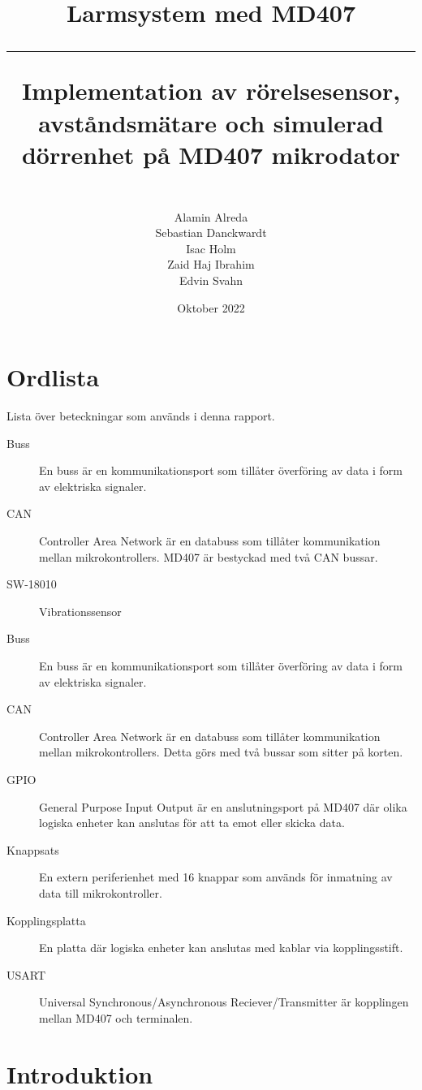 \documentclass{article}
\title{\textbf{Larmsystem med MD407}\\ 
     \hspace{10cm}
     \hrule
    \hspace{10cm}
    Implementation av rörelsesensor, avståndsmätare och simulerad dörrenhet på MD407 mikrodator}
\author{\\Alamin Alreda\\Sebastian Danckwardt\\Isac Holm\\Zaid Haj Ibrahim\\Edvin Svahn}
\date{Oktober 2022}
\begin{document}
\maketitle
\newpage
\tableofcontents
\newpage
\section*{Ordlista}
Lista över beteckningar som används i denna rapport.
\begin{description}

\item[Buss] En buss är en kommunikationsport som tillåter överföring av data i form av elektriska signaler.

\item[CAN] Controller Area Network är en databuss som tillåter kommunikation mellan mikrokontrollers. MD407 är bestyckad med två CAN bussar.

\item[SW-18010] Vibrationssensor

\item[Buss] En buss är en kommunikationsport som tillåter överföring av data i form av elektriska signaler.

\item[CAN] Controller Area Network är en databuss som tillåter kommunikation mellan mikrokontrollers. Detta görs med två bussar som sitter på korten.

\item[GPIO] General Purpose Input Output är en anslutningsport på MD407 där olika logiska enheter kan anslutas för att ta emot eller skicka data.

\item[Knappsats] En extern periferienhet med 16 knappar som används för inmatning av data till mikrokontroller.

\item[Kopplingsplatta] En platta där logiska enheter kan anslutas med kablar via kopplingsstift.

\item[USART] Universal Synchronous/Asynchronous Reciever/Transmitter är kopplingen mellan MD407 och terminalen.

\end{description}
 \newpage

\setcounter{page}{1}
\section{Introduktion}
\end{document}
